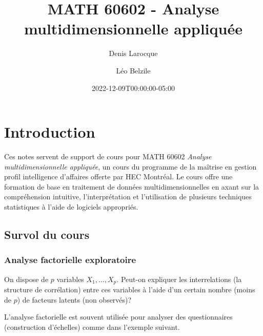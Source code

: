 \documentclass[
  11pt,
  letterpaper,
]{scrbook}
\title{MATH 60602 - Analyse multidimensionnelle appliquée}
\author{Denis Larocque \and Léo Belzile}
\date{2022-12-09T00:00:00-05:00}
\renewcommand*\contentsname{Table des matières}
\newcommand\contentsname{Table des matières}
\theoremstyle{definition}
\theoremstyle{remark}
\begin{document}


\ifdefined\Shaded\renewenvironment{Shaded}{\begin{tcolorbox}[enhanced, frame hidden, boxrule=0pt, borderline west={3pt}{0pt}{shadecolor}, interior hidden, sharp corners, breakable]}{\end{tcolorbox}}\fi

\renewcommand*\contentsname{Table des matières}
{
\setcounter{tocdepth}{2}
\tableofcontents
}
\mainmatter
{}

\hypertarget{introduction}{%
\chapter{Introduction}\label{introduction}}

Ces notes servent de support de cours pour MATH 60602 \emph{Analyse
multidimensionnelle appliquée}, un cours du programme de la maîtrise en
gestion profil intelligence d'affaires offerte par HEC Montréal. Le
cours offre une formation de base en traitement de données
multidimensionnelles en axant sur la compréhension intuitive,
l'interprétation et l'utilisation de plusieurs techniques statistiques à
l'aide de logiciels appropriés.

\hypertarget{survol-du-cours}{%
\section{Survol du cours}\label{survol-du-cours}}

\hypertarget{analyse-factorielle-exploratoire}{%
\subsection{Analyse factorielle
exploratoire}\label{analyse-factorielle-exploratoire}}

On dispose de \(p\) variables \(X_1, \ldots, X_p\). Peut-on expliquer
les interrelations (la structure de corrélation) entre ces variables à
l'aide d'un certain nombre (moins de \(p\)) de facteurs latents (non
observés)?

L'analyse factorielle est souvent utilisée pour analyser des
questionnaires (construction d'échelles) comme dans l'exemple suivant.
\end{document}
